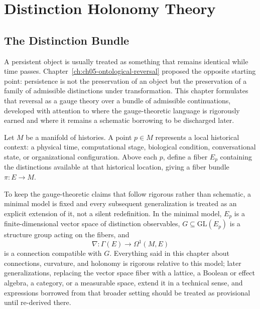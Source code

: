 
\chapter{Distinction Holonomy Theory}
\label{ch:ch06-distinction-holonomy}
\section{The Distinction Bundle}

A persistent object is usually treated as something that remains identical while time passes. Chapter~\ref{ch:ch05-ontological-reversal} proposed the opposite starting point: persistence is not the preservation of an object but the preservation of a family of admissible distinctions under transformation. This chapter formulates that reversal as a gauge theory over a bundle of admissible continuations, developed with attention to where the gauge-theoretic language is rigorously earned and where it remains a schematic borrowing to be discharged later.

Let $M$ be a manifold of histories. A point $p \in M$ represents a local historical context: a physical time, computational stage, biological condition, conversational state, or organizational configuration. Above each $p$, define a fiber $E_p$ containing the distinctions available at that historical location, giving a fiber bundle $\pi : E \to M$.

To keep the gauge-theoretic claims that follow rigorous rather than schematic, a minimal model is fixed and every subsequent generalization is treated as an explicit extension of it, not a silent redefinition. In the minimal model, $E_p$ is a finite-dimensional vector space of distinction observables, $G \subseteq \mathrm{GL}(E_p)$ is a structure group acting on the fibers, and
\[
\nabla : \Gamma(E) \to \Omega^1(M, E)
\]
is a connection compatible with $G$. Everything said in this chapter about connections, curvature, and holonomy is rigorous relative to this model; later generalizations, replacing the vector space fiber with a lattice, a Boolean or effect algebra, a category, or a measurable space, extend it in a technical sense, and expressions borrowed from that broader setting should be treated as provisional until re-derived there.

